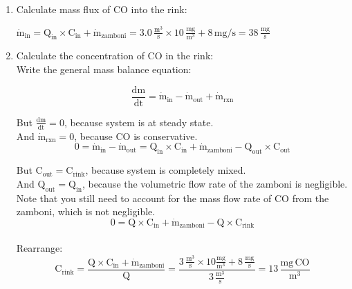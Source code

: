 \documentclass[12pt,letterpaper]{article}
\begin{document}
\begin{enumerate}
\begin{enumerate}

\item Calculate mass flux of CO into the rink:

$\mathrm{\dot{m}_{in} = Q_{in}\times C_{in} + \dot{m}_{zamboni} = 3.0\, \frac{m^3}{s}\times 10\, \frac{mg}{m^3} + 8\, mg/s = 38\, \frac{mg}{s}}$

\item Calculate the concentration of CO in the rink:\\

Write the general mass balance equation:

\begin{equation*}
\mathrm{\frac{dm}{dt} = \dot{m}_{in} - \dot{m}_{out} + \dot{m}_{rxn}}
\end{equation*}

But $\mathrm{\frac{dm}{dt} = 0}$, because system is at steady state.\\

And $\mathrm{\dot{m}_{rxn} = 0}$, because CO is conservative.\\

\begin{equation*}
\mathrm{0 = \dot{m}_{in} - \dot{m}_{out} = Q_{in}\times C_{in} + \dot{m}_{zamboni} - Q_{out}\times C_{out}}
\end{equation*}

But $\mathrm{C_{out} = C_{rink}}$, because system is completely mixed.\\

And $\mathrm{Q_{out} = Q_{in}}$, because the volumetric flow rate of the zamboni is negligible.  Note that you still need to account for the mass flow rate of CO from the zamboni, which is not negligible.\\

\begin{equation*}
\mathrm{0 = Q\times C_{in} + \dot{m}_{zamboni} - Q\times C_{rink}}
\end{equation*}\\

Rearrange:\\

\begin{equation*}
\mathrm{C_{rink} = \frac{Q\times C_{in} + \dot{m}_{zamboni}}{Q} = \frac{3\, \frac{m^3}{s}\times 10 \frac{mg}{m^3} + 8\, \frac{mg}{s}}{3\, \frac{m^3}{s}} = 13\, \frac{mg\, CO}{m^3}}
\end{equation*}


\end{enumerate}








\end{enumerate}
\end{document}
